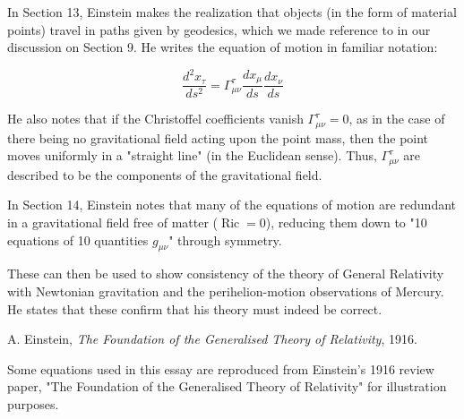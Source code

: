 \documentclass[14pt]{extarticle}
\newcommand{\christoffeltwo}[2]{\Gamma^{#1}_{#2}}
\DeclareMathOperator{\Ric}{Ric}
\begin{document}

In Section 13, Einstein makes the realization that objects (in the form of material points) travel in paths given by geodesics, which we made reference to in our discussion on Section 9. He writes the equation of motion in familiar notation:

\[{\frac {d^{2}x_{\tau }}{ds^{2}}}=\christoffeltwo{\tau}{\mu\nu}{\frac {dx_{\mu }}{ds}}{\frac {dx_{\nu }}{ds}}\]

He also notes that if the Christoffel coefficients vanish $\christoffeltwo{\tau}{\mu\nu} = 0$, as in the case of there being no gravitational field acting upon the point mass, then the point moves uniformly in a "straight line" (in the Euclidean sense). Thus, $\christoffeltwo{\tau}{\mu\nu}$ are described to be the components of the gravitational field.


In Section 14, Einstein notes that many of the equations of motion are redundant in a gravitational field free of matter ($\Ric = 0$), reducing them down to "10 equations of 10 quantities $g_{\mu\nu}$" through symmetry.

These can then be used to show consistency of the theory of General Relativity with Newtonian gravitation and the perihelion-motion observations of Mercury. He states that these confirm that his theory must indeed be correct.



\begin{thebibliography}{9}

A. Einstein, \emph{The Foundation of the Generalised Theory of Relativity}, 1916.

\end{thebibliography}

Some equations used in this essay are reproduced from Einstein's 1916 review paper, "The Foundation of the Generalised Theory of Relativity" for illustration purposes.
\end{document}
